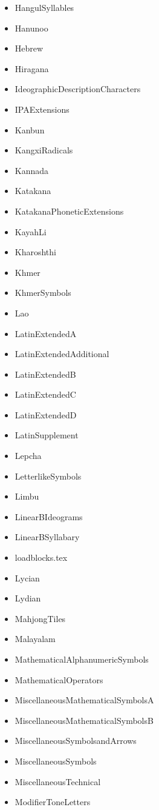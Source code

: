 ﻿\documentclass{article}
\newenvironment{itemlist}{%
  \begin{itemize}
	\setlength{\itemsep}{0pt}
	\setlength{\parsep}{0pt}
	\setlength{\topsep}{0pt}
	\setlength{\partopsep}{0pt}
	\setlength{\parskip}{0pt}
	\setlength{\labelsep}{5pt}}%
{
  \end{itemize}}
\begin{document}
\begin{multicols}{2}
\begin{itemlist}
				\item HangulSyllables
				\item Hanunoo
				\item Hebrew
				\item Hiragana
				\item IdeographicDescriptionCharacters
				\item IPAExtensions
				\item Kanbun
				\item KangxiRadicals
				\item Kannada
				\item Katakana
				\item KatakanaPhoneticExtensions
				\item KayahLi
				\item Kharoshthi
				\item Khmer
				\item KhmerSymbols
				\item Lao
				\item LatinExtendedA
				\item LatinExtendedAdditional
				\item LatinExtendedB
				\item LatinExtendedC
				\item LatinExtendedD
				\item LatinSupplement
				\item Lepcha
				\item LetterlikeSymbols
				\item Limbu
				\item LinearBIdeograms
				\item LinearBSyllabary
				\item loadblocks.tex
				\item Lycian
				\item Lydian
				\item MahjongTiles
				\item Malayalam
				\item MathematicalAlphanumericSymbols
				\item MathematicalOperators
				\item MiscellaneousMathematicalSymbolsA
				\item MiscellaneousMathematicalSymbolsB
				\item MiscellaneousSymbolsandArrows
				\item MiscellaneousSymbols
				\item MiscellaneousTechnical
				\item ModifierToneLetters

\end{itemlist}
\end{multicols}
\end{document}
